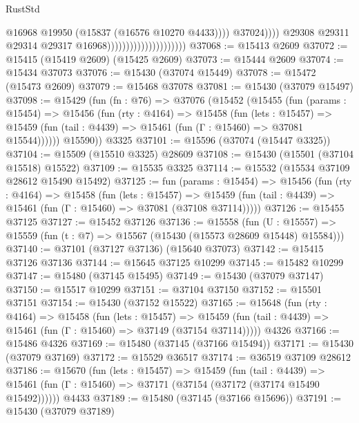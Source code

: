 \begin{lexlean}{RustStd}
\begin{coremodule}
                                                          @16968
                                                          @19950
                                                          (@15837 (@16576 @10270 @4433))))
                                                      @37024))))
                                              @29308
                                              @29311
                                              @29314
                                              @29317
                                              @16968)))))))))))))))))))))
@37068 := @15413 @2609
@37072 := @15415 (@15419 @2609) (@15425 @2609)
@37073 := @15444 @2609
@37074 := @15434 @37073
@37076 := @15430 (@37074 @15449)
@37078 := @15472 (@15473 @2609)
@37079 := @15468 @37078
@37081 := @15430 (@37079 @15497)
@37098 := @15429
    (fun (fn : @76) =>
    @37076
      (@15452
        (@15455
          (fun (params : @15454) =>
          @15456
            (fun (rty : @4164) =>
            @15458
              (fun (lets : @15457) =>
              @15459 (fun (tail : @4439) => @15461 (fun (Γ : @15460) => @37081 @15544))))))
        @15590))
    @3325
@37101 := @15596 (@37074 (@15447 @3325))
@37104 := @15509 (@15510 @3325) @28609
@37108 := @15430 (@15501 (@37104 @15518) @15522)
@37109 := @15535 @3325
@37114 := @15532 (@15534 @37109 @28612 @15490 @15492)
@37125 := fun (params : @15454) =>
  @15456
    (fun (rty : @4164) =>
    @15458
      (fun (lets : @15457) =>
      @15459 (fun (tail : @4439) => @15461 (fun (Γ : @15460) => @37081 (@37108 @37114)))))
@37126 := @15455 @37125
@37127 := @15452 @37126
@37136 := @15558
    (fun (U : @15557) => @15559 (fun (t : @7) => @15567 (@15430 (@15573 @28609 @15448) @15584)))
@37140 := @37101 (@37127 @37136) (@15640 @37073)
@37142 := @15415 @37126 @37136
@37144 := @15645 @37125 @10299
@37145 := @15482 @10299
@37147 := @15480 (@37145 @15495)
@37149 := @15430 (@37079 @37147)
@37150 := @15517 @10299
@37151 := @37104 @37150
@37152 := @15501 @37151
@37154 := @15430 (@37152 @15522)
@37165 := @15648
    (fun (rty : @4164) =>
    @15458
      (fun (lets : @15457) =>
      @15459 (fun (tail : @4439) => @15461 (fun (Γ : @15460) => @37149 (@37154 @37114)))))
    @4326
@37166 := @15486 @4326
@37169 := @15480 (@37145 (@37166 @15494))
@37171 := @15430 (@37079 @37169)
@37172 := @15529 @36517
@37174 := @36519 @37109 @28612
@37186 := @15670
    (fun (lets : @15457) =>
    @15459
      (fun (tail : @4439) =>
      @15461 (fun (Γ : @15460) => @37171 (@37154 (@37172 (@37174 @15490 @15492))))))
    @4433
@37189 := @15480 (@37145 (@37166 @15696))
@37191 := @15430 (@37079 @37189)

\end{coremodule}
\end{lexlean}
